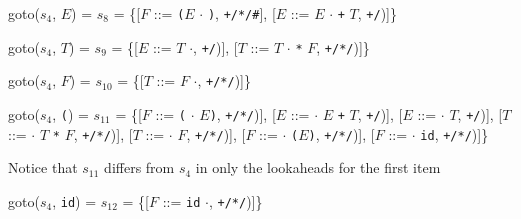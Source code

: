 \documentclass[8pt,a4paper,compress]{beamer}
\newcommand{\mm}[1]{$#1$}
\newcommand{\subs}[2]{${#1}_{#2}$}
\newenvironment{spaced}
{
\smallskip
\hspace{.5cm}
\begin{minipage}[c]{\textwidth}
}
{
\end{minipage}
\smallskip
}
\begin{document}
\begin{frame}[fragile]
\pause

\text{ }
\begin{spaced}
\begin{production}
goto(\subs{s}{4}, \mm{E}) = \subs{s}{8}
                = \{[\mm{F}  ::= \lstinline{(}\mm{E} \mm{\cdot} \lstinline{)},  \lstinline{+/*/#}],
                    [\mm{E}  ::= \mm{E} \mm{\cdot} \lstinline{+} \mm{T}, \lstinline{+/})]\}

goto(\subs{s}{4}, \mm{T}) = \subs{s}{9}
                = \{[\mm{E}  ::= \mm{T} \mm{\cdot}, \lstinline{+/})],
                    [\mm{T}  ::= \mm{T} \mm{\cdot} \lstinline{*} \mm{F}, \lstinline{+/*/})]\}

goto(\subs{s}{4}, \mm{F}) = \subs{s}{10}
                = \{[\mm{T}  ::= \mm{F} \mm{\cdot}, \lstinline{+/*/})]\}

goto(\subs{s}{4}, \lstinline{(}) = \subs{s}{11}
               = \{[\mm{F}  ::= \lstinline{(} \mm{\cdot} \mm{E}\lstinline{)}, \lstinline{+/*/})],
                    [\mm{E}  ::= \mm{\cdot} \mm{E} \lstinline{+} \mm{T}, \lstinline{+/})],
                    [\mm{E}  ::= \mm{\cdot} \mm{T}, \lstinline{+/})],
                    [\mm{T}  ::= \mm{\cdot} \mm{T} \lstinline{*} \mm{F}, \lstinline{+/*/})],
                    [\mm{T}  ::= \mm{\cdot} \mm{F}, \lstinline{+/*/})],
                    [\mm{F}  ::= \mm{\cdot} \lstinline{(}\mm{E}\lstinline{)}, \lstinline{+/*/})],
                    [\mm{F}  ::= \mm{\cdot} \lstinline{id}, \lstinline{+/*/})]\}
\end{production}
\end{spaced}

\pause

Notice that $s_{11}$ differs from $s_4$ in only the lookaheads for the first item

\text{ }
\begin{spaced}
\begin{production}
goto(\subs{s}{4}, \lstinline{id}) = \subs{s}{12}
                = \{[\mm{F}  ::= \lstinline{id} \mm{\cdot}, \lstinline{+/*/})]\}
\end{production}
\end{spaced}
\end{frame}
\end{document}
